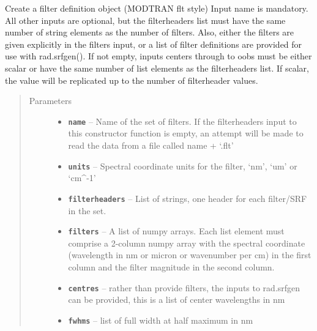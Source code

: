 \documentclass[a4paper,10pt,english]{sphinxmanual}
\begin{document}
\begin{fulllineitems}
\begin{fulllineitems}
\label{packages:radute.Flt.__init__}
Create a filter definition object (MODTRAN flt style)
Input name is mandatory. All other inputs are optional, but the filterheaders list must have the same number of
string elements as the number of filters. Also, either the filters are given explicitly in the filters input, or
a list of filter definitions are provided for use with rad.srfgen().
If not empty, inputs centers through to oobs must be either scalar or have the same number of list elements as
the filterheaders list. If scalar, the value will be replicated up to the number of filterheader values.
\begin{quote}\begin{description}
\item[{Parameters}] \leavevmode\begin{itemize}
\item {} 
\textbf{\texttt{name}} -- Name of the set of filters. If the filterheaders input to this constructor function
is empty, an attempt will be made to read the data from a file called name + `.flt'

\item {} 
\textbf{\texttt{units}} -- Spectral coordinate units for the filter, `nm', `um' or `cm\textasciicircum{}-1'

\item {} 
\textbf{\texttt{filterheaders}} -- List of strings, one header for each filter/SRF in the set.

\item {} 
\textbf{\texttt{filters}} -- A list of numpy arrays. Each list element must comprise a 2-column numpy array with the
spectral coordinate (wavelength in nm or micron or wavenumber per cm) in the first column and the filter
magnitude in the second column.

\item {} 
\textbf{\texttt{centres}} -- rather than provide filters, the inputs to rad.srfgen can be provided, this is a list of center
wavelengths in nm

\item {} 
\textbf{\texttt{fwhms}} -- list of full width at half maximum in nm


\end{itemize}
\end{description}
\end{quote}
\end{fulllineitems}
\end{fulllineitems}
\end{document}
